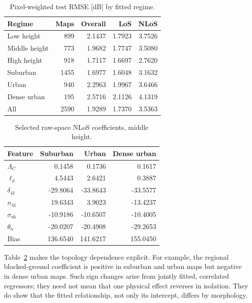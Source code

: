 \documentclass[10pt,conference,letterpaper]{IEEEtran}
\begin{document}
\begin{table}[!t]
\centering
\caption{Pixel-weighted test RMSE [dB] by fitted regime.}
\label{tab:breakdown}
\scriptsize
\setlength{\tabcolsep}{3.5pt}
\begin{tabular}{lrrrr}
\toprule
Regime & Maps & Overall & LoS & NLoS \\
\midrule
Low height & 899 & 2.1437 & 1.7923 & 3.7526 \\
Middle height & 773 & 1.9682 & 1.7747 & 3.5080 \\
High height & 918 & 1.7117 & 1.6697 & 2.7620 \\
\midrule
Suburban & 1455 & 1.6977 & 1.6048 & 3.1632 \\
Urban & 940 & 2.2963 & 1.9967 & 3.6466 \\
Dense urban & 195 & 2.5716 & 2.1126 & 4.1319 \\
\midrule
All & 2590 & 1.9289 & 1.7370 & 3.5363 \\
\bottomrule
\end{tabular}
\end{table}

\begin{table}[t]
\centering
\caption{Selected raw-space NLoS coefficients, middle height.}
\label{tab:nlos-coefficients}
\scriptsize
\setlength{\tabcolsep}{3.1pt}
\begin{tabular}{lrrr}
\toprule
Feature & Suburban & Urban & Dense urban \\
\midrule
$\Lambda_C$ & 0.1458 & 0.1736 & 0.1617 \\
$\ell_d$ & 4.5443 & 2.6421 & 0.3887 \\
$\delta_{41}$ & -29.8064 & -33.8643 & -33.5577 \\
$n_{41}$ & 19.6343 & 3.9023 & -13.4237 \\
$\sigma_{\mathrm{sh}}$ & -10.9186 & -10.6507 & -10.4005 \\
$\theta_n$ & -20.0207 & -20.4908 & -29.2653 \\
Bias & 136.6540 & 141.6217 & 155.0450 \\
\bottomrule
\end{tabular}
\end{table}

Table~\ref{tab:nlos-coefficients} makes the topology dependence explicit.
For example, the regional blocked-ground coefficient is positive in suburban
and urban maps but negative in dense urban maps. Such sign changes arise from
jointly fitted, correlated regressors; they need not mean that one physical
effect reverses in isolation. They do show that the fitted relationship, not
only its intercept, differs by morphology.
\end{document}
